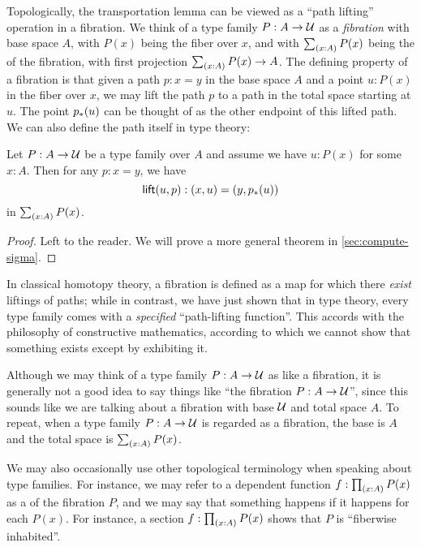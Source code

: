 Topologically, the transportation lemma can be viewed as a ``path lifting'' operation in a fibration.
%
%
We think of a type family $P:A\to \mathcal{U}$ as a \emph{fibration} with base space $A$, with $P(x)$ being the fiber over $x$, and with $\sm{x:A}P(x)$ being the  of the fibration, with first projection $\sm{x:A}P(x)\to A$.
The defining property of a fibration is that given a path $p:x=y$ in the base space $A$ and a point $u:P(x)$ in the fiber over $x$, we may lift the path $p$ to a path in the total space starting at $u$.
The point ${p}_{*}\mathopen{}\left({u}\right)\mathclose{}$ can be thought of as the other endpoint of this lifted path.
We can also define the path itself in type theory:

\begin{lem}\label{thm:path-lifting}
  Let $P:A\to\mathcal{U}$ be a type family over $A$ and assume we have $u:P(x)$ for some $x:A$.
  Then for any $p:x=y$, we have
  \begin{equation*}
    \mathsf{lift}(u,p):(x,u)=(y,{p}_{*}\mathopen{}\left({u}\right)\mathclose{})
  \end{equation*}
  in $\sm{x:A}P(x)$.
\end{lem}
\begin{proof}
  Left to the reader.
  We will prove a more general theorem in \autoref{sec:compute-sigma}.
\end{proof}

In classical homotopy theory, a fibration is defined as a map for which there \emph{exist} liftings of paths; while in contrast, we have just shown that in type theory, every type family comes with a \emph{specified} ``path-lifting function''.
This accords with the philosophy of constructive mathematics, according to which we cannot show that something exists except by exhibiting it.

\begin{rmk}
  Although we may think of a type family $P:A\to \mathcal{U}$ as like a fibration, it is generally not a good idea to say things like ``the fibration $P:A\to\mathcal{U}$'', since this sounds like we are talking about a fibration with base $\mathcal{U}$ and total space $A$.
  To repeat, when a type family $P:A\to \mathcal{U}$ is regarded as a fibration, the base is $A$ and the total space is $\sm{x:A} P(x)$.

  We may also occasionally use other topological terminology when speaking about type families.
  For instance, we may refer to a dependent function $f:\prd{x:A} P(x)$ as a 
  of the fibration $P$, and we may say that something happens 
  if it happens for each $P(x)$.
  For instance, a section $f:\prd{x:A} P(x)$ shows that $P$ is ``fiberwise inhabited''.
\end{rmk}

